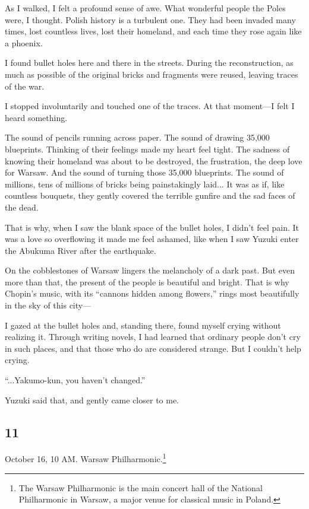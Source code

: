 \documentclass[
    a4paper,
    12pt,
    twoside,
    openany,
    UTF8,
    fontset=windows
]{ctexbook}
\begin{document}
As I walked, I felt a profound sense of awe. What wonderful people the Poles were, I thought. Polish history is a turbulent one. They had been invaded many times, lost countless lives, lost their homeland, and each time they rose again like a phoenix.

I found bullet holes here and there in the streets. During the reconstruction, as much as possible of the original bricks and fragments were reused, leaving traces of the war.

I stopped involuntarily and touched one of the traces. At that moment---I felt I heard something.

The sound of pencils running across paper. The sound of drawing 35,000 blueprints. Thinking of their feelings made my heart feel tight. The sadness of knowing their homeland was about to be destroyed, the frustration, the deep love for Warsaw. And the sound of turning those 35,000 blueprints. The sound of millions, tens of millions of bricks being painstakingly laid... It was as if, like countless bouquets, they gently covered the terrible gunfire and the sad faces of the dead.

That is why, when I saw the blank space of the bullet holes, I didn't feel pain. It was a love so overflowing it made me feel ashamed, like when I saw Yuzuki enter the Abukuma River after the earthquake.

On the cobblestones of Warsaw lingers the melancholy of a dark past. But even more than that, the present of the people is beautiful and bright. That is why Chopin's music, with its ``cannons hidden among flowers,'' rings most beautifully in the sky of this city---

I gazed at the bullet holes and, standing there, found myself crying without realizing it. Through writing novels, I had learned that ordinary people don't cry in such places, and that those who do are considered strange. But I couldn't help crying.

``...Yakumo-kun, you haven't changed.''

Yuzuki said that, and gently came closer to me.


\subsection*{11}

October 16, 10 AM. Warsaw Philharmonic.\footnote{The Warsaw Philharmonic is the main concert hall of the National Philharmonic in Warsaw, a major venue for classical music in Poland.}
\end{document}
